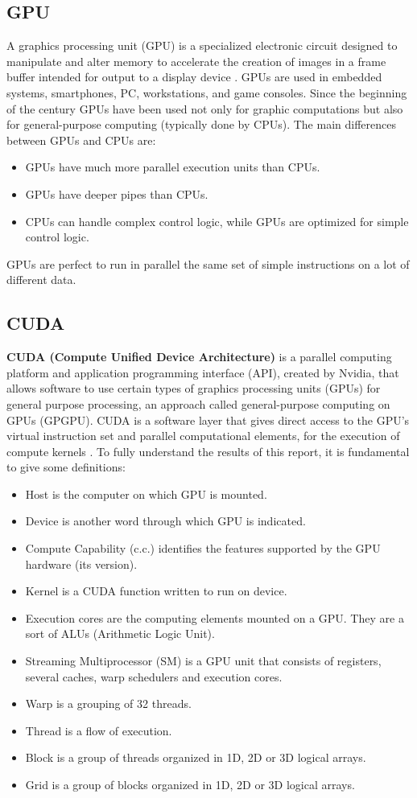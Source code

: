 \subsection{GPU}
A graphics processing unit (GPU) is a specialized electronic circuit designed to manipulate and alter memory to accelerate the creation of images in a frame buffer intended for output to a display device \cite{wiki:GPU}.
GPUs are used in embedded systems, smartphones, PC, workstations, and game consoles.
Since the beginning of the century GPUs have been used not only for graphic computations but also for general-purpose computing (typically done by CPUs).
The main differences between GPUs and CPUs are:
\begin{itemize}
    \item GPUs have much more parallel execution units than CPUs.
    \item GPUs have deeper pipes than CPUs.
    \item CPUs can handle complex control logic, while GPUs are optimized for simple control logic.
\end{itemize}
GPUs are perfect to run in parallel the same set of simple instructions on a lot of different data.

\subsection{CUDA}
\textbf{CUDA (Compute Unified Device Architecture)} is a parallel computing platform and application programming interface (API), created by Nvidia, that allows software to use certain types of graphics processing units (GPUs) for general purpose processing, an approach called general-purpose computing on GPUs (GPGPU).
CUDA is a software layer that gives direct access to the GPU's virtual instruction set and parallel computational elements, for the execution of compute kernels \cite{wiki:CUDA}.
To fully understand the results of this report, it is fundamental to give some definitions:
\begin{itemize}
    \item Host is the computer on which GPU is mounted.
    \item Device is another word through which GPU is indicated.
    \item Compute Capability (c.c.) identifies the features supported by the GPU hardware (its version).
    \item Kernel is a CUDA function written to run on device.
    \item Execution cores are the computing elements mounted on a GPU. They are a sort of ALUs (Arithmetic Logic Unit).
    \item Streaming Multiprocessor (SM) is a GPU unit that consists of registers, several caches, warp schedulers and execution cores.
    \item Warp is a grouping of 32 threads.
    \item Thread is a flow of execution.
    \item Block is a group of threads organized in 1D, 2D or 3D logical arrays.
    \item Grid is a group of blocks organized in 1D, 2D or 3D logical arrays.
\end{itemize}

